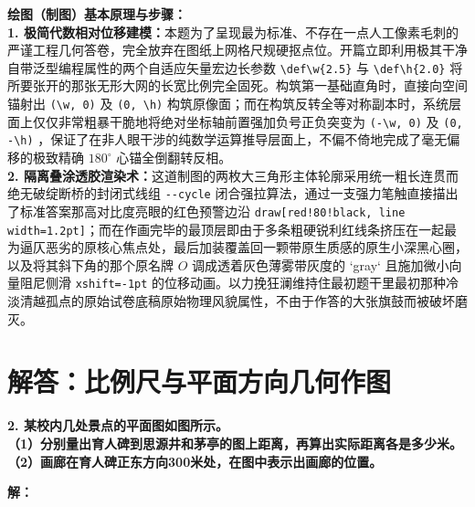 \vspace{0.6cm}

{\small\color{blue!70!black}
\textbf{绘图（制图）基本原理与步骤：}\\
\textbf{1. 极简代数相对位移建模：}本题为了呈现最为标准、不存在一点人工像素毛刺的严谨工程几何答卷，完全放弃在图纸上网格尺规硬抠点位。开篇立即利用极其干净自带泛型编程属性的两个自适应矢量宏边长参数 \texttt{\textbackslash def\textbackslash w\{2.5\}} 与 \texttt{\textbackslash def\textbackslash h\{2.0\}} 将所要张开的那张无形大网的长宽比例完全固死。构筑第一基础直角时，直接向空间锚射出 \texttt{(\textbackslash w, 0)} 及 \texttt{(0, \textbackslash h)} 构筑原像面；而在构筑反转全等对称副本时，系统层面上仅仅非常粗暴干脆地将绝对坐标轴前置强加负号正负突变为 \texttt{(-\textbackslash w, 0)} 及 \texttt{(0, -\textbackslash h)} ，保证了在非人眼干涉的纯数学运算推导层面上，不偏不倚地完成了毫无偏移的极致精确 $180^\circ$ 心锚全倒翻转反相。\\
\textbf{2. 隔离叠涂透胶渲染术：}这道制图的两枚大三角形主体轮廓采用统一粗长连贯而绝无破绽断桥的封闭式线组 \texttt{-{}-cycle} 闭合强拉算法，通过一支强力笔触直接描出了标准答案那高对比度亮眼的红色预警边沿 \texttt{draw[red!80!black, line width=1.2pt]}；而在作画完毕的最顶层即由于多条粗硬锐利红线条挤压在一起最为逼仄恶劣的原核心焦点处，最后加装覆盖回一颗带原生质感的原生小深黑心圈，以及将其斜下角的那个原名牌 $O$ 调成透着灰色薄雾带灰度的 `gray` 且施加微小向量阻尼侧滑 \texttt{xshift=-1pt} 的位移动画。以力挽狂澜维持住最初题干里最初那种冷淡清越孤点的原始试卷底稿原始物理风貌属性，不由于作答的大张旗鼓而被破坏磨灭。
}

\newpage



\section{解答：比例尺与平面方向几何作图}

\vspace{0.6cm}

\textbf{2. 某校内几处景点的平面图如图所示。}\\
\textbf{（1）分别量出育人碑到思源井和茅亭的图上距离，再算出实际距离各是多少米。}\\
\textbf{（2）画廊在育人碑正东方向300米处，在图中表示出画廊的位置。}

\vspace{0.4cm}

\textbf{解：}

